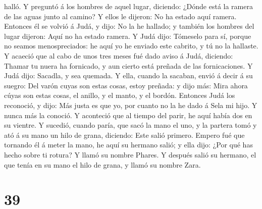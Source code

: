 halló.  Y preguntó á los hombres de aquel lugar, diciendo:
¿Dónde está la ramera de las aguas junto al camino? Y ellos le dijeron:
No ha estado aquí ramera.  Entonces él se volvió á Judá, y
dijo: No la he hallado; y también los hombres del lugar dijeron: Aquí no
ha estado ramera.  Y Judá dijo: Tómeselo para sí, porque no
seamos menospreciados: he aquí yo he enviado este cabrito, y tú no la
hallaste.  Y acaeció que al cabo de unos tres meses fué
dado aviso á Judá, diciendo: Thamar tu nuera ha fornicado, y aun cierto
está preñada de las fornicaciones. Y Judá dijo: Sacadla, y sea quemada.
 Y ella, cuando la sacaban, envió á decir á su suegro: Del
varón cuyas son estas cosas, estoy preñada: y dijo más: Mira ahora cúyas
son estas cosas, el anillo, y el manto, y el bordón. 
Entonces Judá los reconoció, y dijo: Más justa es que yo, por cuanto no
la he dado á Sela mi hijo. Y nunca más la conoció.  Y
aconteció que al tiempo del parir, he aquí había dos en su vientre.
 Y sucedió, cuando paría, que sacó la mano el uno, y la
partera tomó y ató á su mano un hilo de grana, diciendo: Este salió
primero.  Empero fué que tornando él á meter la mano, he
aquí su hermano salió; y ella dijo: ¿Por qué has hecho sobre ti rotura?
Y llamó su nombre Phares.  Y después salió su hermano, el
que tenía en su mano el hilo de grana, y llamó su nombre Zara.

\hypertarget{section-38}{%
\section{39}\label{section-38}}


